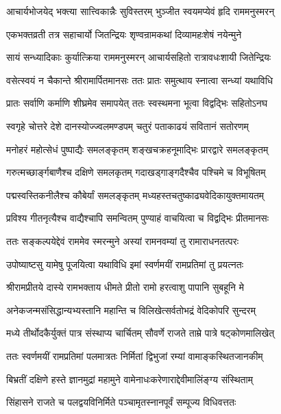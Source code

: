 \twolineshloka
{आचार्यभोजयेद् भक्त्या सात्त्विकान्नैः सुविस्तरम्}
{भुञ्जीत स्वयमप्येवं हृदि राममनुस्मरन्}%

\twolineshloka
{एकभक्तव्रती तत्र सहाचार्यो जितन्द्रियः}
{शृण्वन्रामकथां दिव्यामहःशेषं नयेन्मुने}%

\twolineshloka
{सायं सन्ध्यादिकाः कुर्यात्क्रिया राममनुस्मरन्}
{आचार्यसहितो रात्रावधःशायी जितेन्द्रियः}%

\twolineshloka
{वसेत्स्वयं न चैकान्ते श्रीरामार्पितमानसः}
{ततः प्रातः समुत्थाय स्नात्वा सन्ध्यां यथाविधि}%

\twolineshloka
{प्रातः सर्वाणि कर्माणि शीघ्रमेव समापयेत्}
{ततः स्वस्थमना भूत्वा विद्वद्भिः सहितोऽनघ}%

\twolineshloka
{स्वगृहे चोत्तरे देशे दानस्योज्ज्वलमण्डपम्}%
{चतुरं पताकाढयं सवितानं सतोरणम्}%

\twolineshloka
{मनोहरं महोत्सेधं पुष्पाद्यैः समलङ्कृतम्}
{शङ्खचक्रहनूमाद्भिः प्रारद्वारे समलङ्कृतम्}%

\twolineshloka
{गरुत्मच्छार्ङ्गबाणैश्च दक्षिणे समलकृतम्}
{गदाखड्गाङ्गदैश्चैव पश्चिमे च विभूषितम्}%

\twolineshloka
{पद्मस्वस्तिकनीलैश्च कौबेर्यां समलङ्कृतम्}
{मध्यहस्तचतुष्काढ्यवेदिकायुक्तमायतम्}%

\twolineshloka
{प्रविश्य गीतनृत्यैश्च वाद्यैश्चापि समन्वितम्}
{पुण्याहं वाचयित्वा च विद्वद्भिः प्रीतमानसः}%

\twolineshloka
{ततः सङ्कल्पयेद्देवं राममेव स्मरन्मुने}
{अस्यां रामनवम्यां तु रामाराधनतत्परः}%

\twolineshloka
{उपोष्याष्टसु यामेषु पूजयित्वा यथाविधि}
{इमां स्वर्णमयीं रामप्रतिमां तु प्रयत्नतः}%

\twolineshloka
{श्रीरामप्रीतये दास्ये रामभक्ताय धीमते}
{प्रीतो रामो हरत्वाशु पापानि सुबहूनि मे}%

\twolineshloka
{अनेकजन्मसंसिद्धान्यभ्यस्तानि महान्ति च}
{विलिखेत्सर्वतोभद्रं वेदिकोपरि सुन्दरम्}%

\twolineshloka
{मध्ये तीर्थोदकैर्युक्तं पात्र संस्थाप्य चार्चितम्}
{सौवर्णे राजते ताम्रे पात्रे षट्कोणमालिखेत्}%

\twolineshloka
{ततः स्वर्णमयीं रामप्रतिमां पलमात्रतः}
{निर्मितां द्विभुजां रम्यां वामाङ्कस्थितजानकीम्}%

\twolineshloka
{बिभ्रतीं दक्षिणे हस्ते ज्ञानमुद्रां महामुने}
{वामेनाधःकरेणाराद्देवीमालिंङ्ग्य संस्थिताम्}%

\twolineshloka
{सिंहासने राजते च पलद्वयविनिर्मिते}
{पञ्चामृतस्नानपूर्वं सम्पूज्य विधिवत्ततः}%


